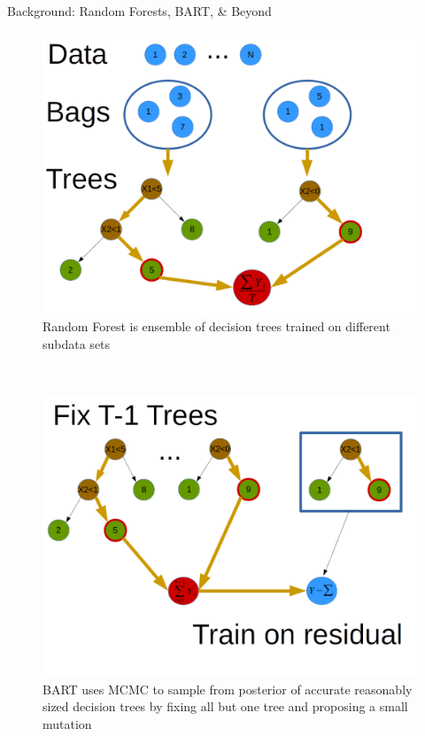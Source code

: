 \documentclass{beamer}
\begin{document}
\begin{frame}
\begin{columns}
\begin{column}{.33\textwidth}
\begin{minipage}{.98\textwidth}
{\begin{myblock}{Background: Random Forests, BART, \& Beyond}
\begin{figure}[h]
\includegraphics[scale=0.8]{pres_rf.png}
    \caption{Random Forest is ensemble of decision trees trained on different subdata sets \cite{breiman2001random}}
\end{figure}

             \\ \vspace{-2em}
\begin{figure}[h]
\includegraphics[scale=0.8]{pres_bart.png}
\caption{BART uses MCMC to sample from posterior of accurate reasonably sized decision trees by fixing all but one tree and proposing a small mutation \cite{chipman2010bart}}
\end{figure}


\end{myblock}}
\end{minipage}
\end{column}
\end{columns}
\end{frame}
\end{document}
